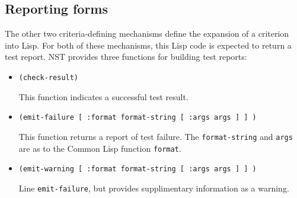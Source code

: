 \subsection{Reporting forms}
\label{sec:criteria-forms-report}
The other two criteria-defining mechanisms define the expansion of a
criterion into Lisp.  For both of these mechanisms, this Lisp code is
expected to return a test report.  NST provides three functions for
building test reports:
\begin{itemize}
\item\texttt{(check-result)}\par This function indicates a successful
  test result.
\item\texttt{(emit-failure [ :format format-string [ :args args ] ] )}
  \par This function returns a report of test failure.  The
  \texttt{format-string} and \texttt{args} are as to the Common Lisp
  function \texttt{format}.
\item\texttt{(emit-warning [ :format format-string [ :args args ] ] )}
  \par Line \texttt{emit-failure}, but provides supplimentary
  information as a warning.
\end{itemize}

